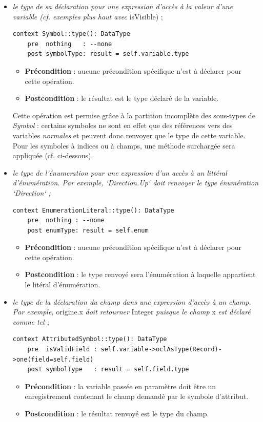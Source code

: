 \documentclass[oneside,a4paper]{book}
\begin{document}
\begin{itemize}
    \item \textit{le type de sa déclaration pour une expression d'accès à la valeur d'une variable (cf. exemples plus haut avec} isVisible{) ;}
    \begin{lstlisting}
context Symbol::type(): DataType
    pre  nothing   : --none
    post symbolType: result = self.variable.type
    \end{lstlisting}
    \begin{itemize}
        \item \textbf{Précondition} : aucune précondition spécifique n'est à déclarer pour cette opération.
        \item \textbf{Postcondition} : le résultat est le type déclaré de la variable.
    \end{itemize}
    
    Cette opération est permise grâce à la partition incomplète des sous-types de \textit{Symbol} : certains symboles ne sont en effet que des références vers des variables \textit{normales} et peuvent donc renvoyer que le type de cette variable. Pour les symboles à indices ou à champs, une méthode surchargée sera appliquée (cf. ci-dessous).

    \item \textit{le type de l'énumeration pour une expression d'un accès à un littéral d'énumération. Par exemple, `Direction.Up` doit renvoyer le type énumération `Direction` ;}
    \begin{lstlisting}
context EnumerationLiteral::type(): DataType
    pre  nothing : --none
    post enumType: result = self.enum
    \end{lstlisting}
    \begin{itemize}
        \item \textbf{Précondition} : aucune précondition spécifique n'est à déclarer pour cette opération.
        \item \textbf{Postcondition} : le type renvoyé sera l'énumération à laquelle appartient le litéral d'énumération.
    \end{itemize}

    \item \textit{le type de la déclaration du champ dans une expression d'accès à un champ. Par exemple,} origine.x \textit{doit retourner} Integer \textit{puisque le champ} x \textit{est déclaré comme tel ;}
    \begin{lstlisting}
context AttributedSymbol::type(): DataType
    pre  isValidField : self.variable->oclAsType(Record)->one(field=self.field)
    post symbolType   : result = self.field.type
    \end{lstlisting}
    \begin{itemize}
        \item \textbf{Précondition} : la variable passée en paramètre doit être un enregistrement contenant le champ demandé par le symbole d'attribut.
        \item \textbf{Postcondition} : le résultat renvoyé est le type du champ.
    \end{itemize}
    

\end{itemize}
\end{document}
